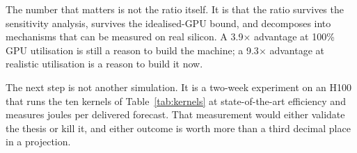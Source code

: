 The number that matters is not the ratio itself. It is that the ratio survives the sensitivity
analysis, survives the idealised-GPU bound, and decomposes into mechanisms that can be measured on
real silicon. A 3.9$\times$ advantage at 100\% GPU utilisation is still a reason to build the
machine; a 9.3$\times$ advantage at realistic utilisation is a reason to build it now.

The next step is not another simulation. It is a two-week experiment on an H100 that runs the ten
kernels of Table~\ref{tab:kernels} at state-of-the-art efficiency and measures joules per
delivered forecast. That measurement would either validate the thesis or kill it, and either
outcome is worth more than a third decimal place in a projection.
